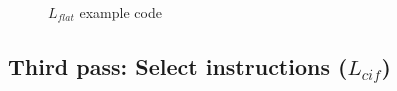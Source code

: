 \begin{figure}[h!]
	
	\caption{$L_{flat}$ example code}
	\label{code:flat}
\end{figure}


\subsection{Third pass: Select instructions ($L_{cif}$)}

\lipsum[2-3]
